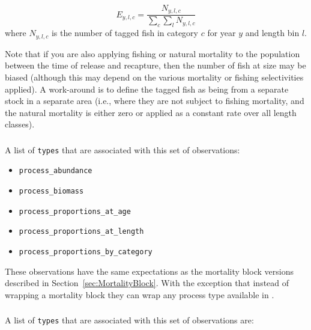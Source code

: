 \begin{equation}
E_{y,l,c} = \frac{N_{y,l,c}}{\sum_c\sum_l N_{y,l,c}}
\end{equation}
where $N_{y,l,c}$ is the number of tagged fish in category \(c\) for year \(y\) and length bin \(l\).

Note that if you are also applying fishing or natural mortality to the population between the time of release and recapture, then the number of fish at size may be biased (although this may depend on the various mortality or fishing selectivities applied). A work-around is to define the tagged fish as being from a separate stock in a separate area (i.e., where they are not subject to fishing mortality, and the natural mortality is either zero or applied as a constant rate over all length classes).
\fi %


\subsubsection{}

A list of \texttt{types} that are associated with this set of observations:

\begin{itemize}
	\item \texttt{process\_abundance}
	\item \texttt{process\_biomass}
	\item \texttt{process\_proportions\_at\_age}
	\item \texttt{process\_proportions\_at\_length}
	\item \texttt{process\_proportions\_by\_category}
\end{itemize}

These observations have the same expectations as the mortality block versions described in Section~\ref{sec:MortalityBlock}. With the exception that instead of wrapping a mortality block they can wrap any process type available in \CNAME.

\subsubsection{}

A list of \texttt{types} that are associated with this set of observations are:

